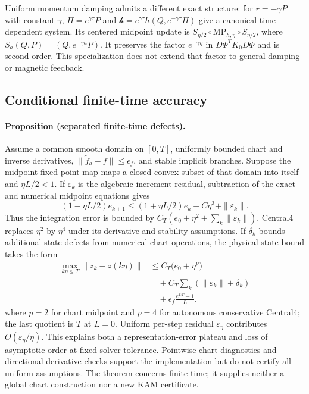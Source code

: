 Uniform momentum damping admits a different exact structure: for $r=-\gamma P$ with constant $\gamma$, $\Pi=e^{\gamma\tau}P$ and $\mathcal h=e^{\gamma\tau}h(Q,e^{-\gamma\tau}\Pi)$ give a canonical time-dependent system. Its centered midpoint update is $S_{\eta/2}\circ\mathrm{MP}_{h,\eta}\circ S_{\eta/2}$, where $S_a(Q,P)=(Q,e^{-\gamma a}P)$. It preserves the factor $e^{-\gamma\eta}$ in $D\Phi^TK_0D\Phi$ and is second order. This specialization does not extend that factor to general damping or magnetic feedback.

\subsection{Conditional finite-time accuracy}
\paragraph{Proposition (separated finite-time defects).}\label{thm:finite-time}
Assume a common smooth domain on $[0,T]$, uniformly bounded chart and inverse derivatives, $\|\widetilde f_a-f\|\le\epsilon_f$, and stable implicit branches. Suppose the midpoint fixed-point map maps a closed convex subset of that domain into itself and $\eta L/2<1$. If $\varepsilon_k$ is the algebraic increment residual, subtraction of the exact and numerical midpoint equations gives
\begin{equation}
 (1-\eta L/2)e_{k+1}\le(1+\eta L/2)e_k+C\eta^3+\|\varepsilon_k\|.
 \label{eq:th-residual-recursion}
\end{equation}
Thus the integration error is bounded by $C_T(e_0+\eta^2+\sum_k\|\varepsilon_k\|)$. Central4 replaces $\eta^2$ by $\eta^4$ under its derivative and stability assumptions. If $\delta_k$ bounds additional state defects from numerical chart operations, the physical-state bound takes the form
\begin{equation}
 \begin{aligned}
 \max_{k\eta\le T}\|z_k-z(k\eta)\|
 &\le C_T\bigl(e_0+\eta^p\bigr)\\
 &\quad+C_T\sum_k(\|\varepsilon_k\|+\delta_k)\\
 &\quad+\epsilon_f\frac{e^{LT}-1}{L}.
\end{aligned}
 \label{eq:th-error-bound}
\end{equation}
where $p=2$ for chart midpoint and $p=4$ for autonomous conservative Central4; the last quotient is $T$ at $L=0$. Uniform per-step residual $\varepsilon_\eta$ contributes $O(\varepsilon_\eta/\eta)$. This explains both a representation-error plateau and loss of asymptotic order at fixed solver tolerance. Pointwise chart diagnostics and directional derivative checks support the implementation but do not certify all uniform assumptions. The theorem concerns finite time; it supplies neither a global chart construction nor a new KAM certificate.

